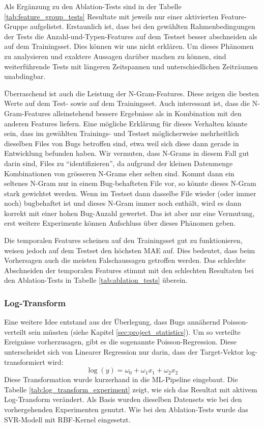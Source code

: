 \documentclass[10pt, a4paper]{article}
\begin{document}
Als Ergänzung zu den Ablation-Tests sind in der Tabelle \ref{tab:feature_group_tests} Resultate mit jeweils nur einer aktivierten Feature-Gruppe aufgelistet. Erstaunlich ist, dass bei den gewählten Rahmenbedingungen der Tests die Anzahl-und-Typen-Features auf dem Testset besser abschneiden als auf dem Trainingsset. Dies können wir uns nicht erklären. Um dieses Phänomen zu analysieren und exaktere Aussagen darüber machen zu können, sind weiterführende Tests mit längeren Zeitspannen und unterschiedlichen Zeiträumen unabdingbar.

Überraschend ist auch die Leistung der N-Gram-Features. Diese zeigen die besten Werte auf dem Test- sowie auf dem Trainingsset. Auch interessant ist, dass die N-Gram-Features alleinstehend bessere Ergebnisse als in Kombination mit den anderen Features liefern. Eine mögliche Erklärung für dieses Verhalten könnte sein, dass im gewählten Trainings- und Testset möglicherweise mehrheitlich dieselben Files von Bugs betroffen sind, etwa weil sich diese dann gerade in Entwicklung befunden haben. Wir vermuten, dass N-Grams in diesem Fall gut darin sind, Files zu ``identifizieren'', da aufgrund der kleinen Datenmenge Kombinationen von grösseren N-Grams eher selten sind. Kommt dann ein seltenes N-Gram nur in einem Bug-behafteten File vor, so könnte dieses N-Gram stark gewichtet werden. Wenn im Testset dann dasselbe File wieder (oder immer noch) bugbehaftet ist und dieses N-Gram immer noch enthält, wird es dann korrekt mit einer hohen Bug-Anzahl gewertet. Das ist aber nur eine Vermutung, erst weitere Experimente können Aufschluss über dieses Phänomen geben.

Die temporalen Features scheinen auf den Trainingsset gut zu funktionieren, weisen jedoch auf dem Testset den höchsten \ac{MAE} auf. Dies bedeutet, dass beim Vorhersagen auch die meisten Falschaussagen getroffen werden. Das schlechte Abschneiden der temporalen Features stimmt mit den schlechten Resultaten bei den Ablation-Tests in Tabelle \ref{tab:ablation_tests} überein. 

\subsubsection{Log-Transform} \label{sec:log_transform_results}
Eine weitere Idee entstand aus der Überlegung, dass Bugs annähernd Poisson-verteilt sein müssten (siehe Kapitel \ref{sec:project_statistics}). Um so verteilte Ereignisse vorherzusagen, gibt es die sogenannte Poisson-Regression. Diese unterscheidet sich von Linearer Regression nur darin, dass der Target-Vektor log-transformiert wird:
\[
	\log(y) = \omega_0 + \omega_1 x_1 + \omega_2 x_2
\]
Diese Transformation wurde kurzerhand in die ML-Pipeline eingebaut. Die Tabelle \ref{tab:log_transform_experiment} zeigt, wie sich das Resultat mit aktivem Log-Transform verändert. Als Basis wurden dieselben Datensets wie bei den vorhergehenden Experimenten genutzt. Wie bei den Ablation-Tests wurde das SVR-Modell mit \ac{RBF}-Kernel eingesetzt.
\end{document}
